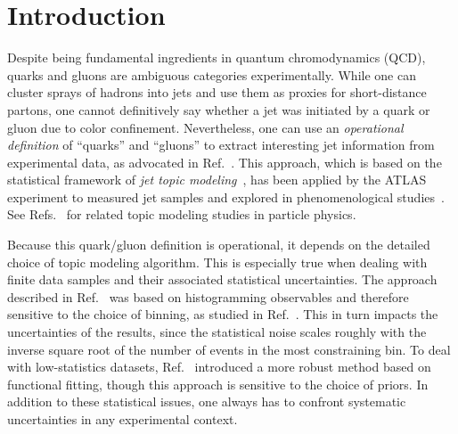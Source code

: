 \documentclass[aps,prd,twocolumn,preprintnumbers,nofootinbib,longbibliography,floatfix]{revtex4-1}
\DeclareRobustCommand{\Ref}[1]{Ref.~\cite{#1}}
\DeclareRobustCommand{\Refs}[1]{Refs.~\cite{#1}}
\begin{document}
\maketitle
{\small
\tableofcontents
}


\section{Introduction}

Despite being fundamental ingredients in quantum chromodynamics (QCD), quarks and gluons are ambiguous categories experimentally.
%
While one can cluster sprays of hadrons into jets and use them as proxies for short-distance partons, one cannot definitively say whether a jet was initiated by a quark or gluon due to color confinement.
%
Nevertheless, one can use an \emph{operational definition} of ``quarks'' and ``gluons'' to extract interesting jet information from experimental data, as advocated in \Ref{Komiske:2018vkc}.
%
This approach, which is based on the statistical framework of \emph{jet topic modeling}~\cite{Metodiev:2018ftz}, has been applied by the ATLAS experiment to measured jet samples \cite{ATLAS:2019rqw} and explored in phenomenological studies~\cite{radha_phdthesis,Brewer:2020och,Stewart:2022ari,Ying:2022jvy}.
%
See \Refs{Dillon:2019cqt,Alvarez:2019knh,Dillon:2020quc} for related topic modeling studies in particle physics.


Because this quark/gluon definition is operational, it depends on the detailed choice of topic modeling algorithm.
%
This is especially true when dealing with finite data samples and their associated statistical uncertainties.
%
The approach described in \Ref{Metodiev:2018ftz} was based on histogramming observables and therefore sensitive to the choice of binning, as studied in \Ref{radha_phdthesis}.
%
This in turn impacts the uncertainties of the results, since the statistical noise scales roughly with the inverse square root of the number of events in the most constraining bin.
%
To deal with low-statistics datasets, \Ref{Brewer:2020och} introduced a more robust method based on functional fitting, though this approach is sensitive to the choice of priors.
%
In addition to these statistical issues, one always has to confront systematic uncertainties in any experimental context.
\end{document}
